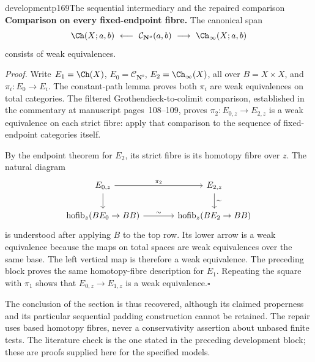 \begin{dcomment}{development}{p169}{The sequential intermediary and the repaired comparison}
\textbf{Comparison on every fixed-endpoint fibre.}\ours\quad
The canonical span
\[
 \Ch(X;a,b)\ \longleftarrow\
 \mathcal C_{\mathbf N^o}(a,b)\ \longrightarrow\
 \Ch_\infty(X;a,b)
\]
consists of weak equivalences.

\emph{Proof.} Write $E_1=\Ch(X)$, $E_0=\mathcal C_{\mathbf N^o}$, $E_2=\Ch_\infty(X)$, all over $B=X\times X$, and $\pi_i:E_0\to E_i$. The constant-path lemma proves both $\pi_i$ are weak equivalences on total categories. The filtered Grothendieck-to-colimit comparison, established in the commentary at manuscript pages~108--109, proves $\pi_2:E_{0,z}\to E_{2,z}$ is a weak equivalence on each strict fibre: apply that comparison to the sequence of fixed-endpoint categories itself.

By the endpoint theorem for $E_2$, its strict fibre is its homotopy fibre over $z$. The natural diagram
\[
\begin{tikzcd}[column sep=large]
 E_{0,z}\arrow[r,"\pi_2"]\arrow[d] & E_{2,z}\arrow[d,"\sim"]\\
 \operatorname{hofib}_z(BE_0\to BB)\arrow[r,"\sim"] &
 \operatorname{hofib}_z(BE_2\to BB)
\end{tikzcd}
\]
is understood after applying $B$ to the top row. Its lower arrow is a weak equivalence because the maps on total spaces are weak equivalences over the same base. The left vertical map is therefore a weak equivalence. The preceding block proves the same homotopy-fibre description for $E_1$. Repeating the square with $\pi_1$ shows that $E_{0,z}\to E_{1,z}$ is a weak equivalence.\hfill$\square$

The conclusion of the section is thus recovered, although its claimed properness and its particular sequential padding construction cannot be retained. The repair uses based homotopy fibres, never a conservativity assertion about unbased finite tests. The literature check is the one stated in the preceding development block; these are proofs supplied here for the specified models.
\end{dcomment}

